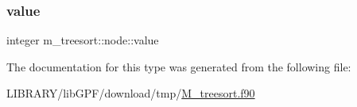 \mbox{\label{structm__treesort_1_1node_a8d43ab5fa2b62b0255b0510173508026}} 
\subsubsection{\texorpdfstring{value}{value}}
{\footnotesize\ttfamily integer m\+\_\+treesort\+::node\+::value}



The documentation for this type was generated from the following file\+:\begin{DoxyCompactItemize}
\item 
L\+I\+B\+R\+A\+R\+Y/lib\+G\+P\+F/download/tmp/\hyperlink{M__treesort_8f90}{M\+\_\+treesort.\+f90}\end{DoxyCompactItemize}

